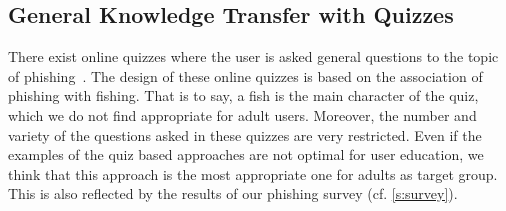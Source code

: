 \subsection{General Knowledge Transfer with Quizzes}
There exist online quizzes where the user is asked general questions to the topic of phishing~\cite{icicibank,onguardonline}. 
The design of these online quizzes is based on the association of phishing with fishing. 
That is to say, a fish is the main character of the quiz, which we do not find appropriate for adult users. 
Moreover, the number and variety of the questions asked in these quizzes are very restricted. 
Even if the examples of the quiz based approaches are not optimal for user education, we think that this approach is the most appropriate one for adults as target group. 
This is also reflected by the results of our phishing survey (cf. \autoref{s:survey}).

